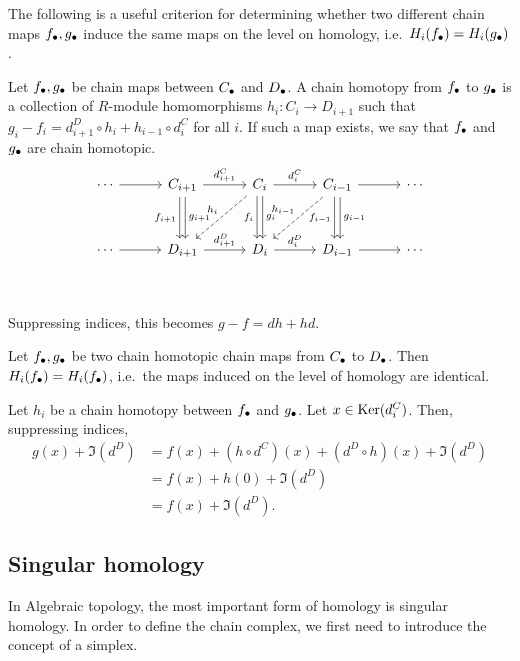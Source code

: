 The following is a useful criterion for determining whether two different chain maps $f_\bullet, g_\bullet$ induce the same maps on the level on homology, i.e.\ $H_i(f_\bullet) = H_i(g_\bullet)$.
\begin{definition}
    Let $f_\bullet, g_\bullet$ be chain maps between  $C_\bullet$ and $D_\bullet$.
    A chain homotopy from  $f_\bullet$ to  $g_\bullet$ is a collection of  $R$-module homomorphisms $h_i: C_i \to  D_{i+1}$ such that $g_i - f_i = d^{D}_{i+1}  \circ  h_i + h_{i-1}  \circ  d_i^{C}$ for all $i$.
    If such a map exists, we say that $f_\bullet$ and  $g_\bullet$ are chain homotopic.
    \[
        \begin{tikzcd}[column sep=3em, row sep=3em]
            \cdots  \arrow[r, ""]&
            C_{i+1} \arrow[r, "d_{i+1}^{C}"] \arrow[d, "f_{i+1}"', shift right=2pt] \arrow[d, "g_{i+1}", shift left=2pt]&
            C_{i} \arrow[r, "d_{i}^{C}"] \arrow[d, "f_i"', shift right=2pt] \arrow[d, "g_{i}", shift left=2pt] \arrow[dl, "h_i"', dashed]&
            C_{i-1} \arrow[r, ""] \arrow[d, "f_{i-1}"', shift right=2pt]\arrow[d, "g_{i-1}", shift left=2pt] \arrow[dl, "h_{i-1}"', dashed]&
            \cdots \\
            \cdots  \arrow[r, ""]&
            D_{i+1} \arrow[r, "d_{i+1}^{D}"] &
            D_{i} \arrow[r, "d_{i}^{D}"] &
            D_{i-1} \arrow[r, ""] &
            \cdots \\
        \end{tikzcd}
    \]
    Suppressing indices, this becomes $g - f = dh + hd$.
\end{definition}
\begin{prop}
    Let $f_\bullet, g_\bullet$ be two chain homotopic chain maps from $C_\bullet$ to $D_\bullet$. 
    Then $H_i(f_\bullet) = H_i(f_\bullet)$, i.e.\ the maps induced on the level of homology are identical.
\end{prop}
\begin{myproof}
    Let $h_i$ be a chain homotopy between  $f_\bullet$ and  $g_\bullet$.
    Let $x \in \operatorname{Ker}(d_i^{C})$.
    Then, suppressing indices,
    \begin{align*}
        g(x) + \Im(d^{D}) &= f(x) + (h  \circ  d^{C})(x) + (d^{D}  \circ h)(x)  + \Im(d^{D})\\
                          &= f(x) + h(0) + \Im(d^{D})\\
                        &= f(x) + \Im(d^{D}).
    \end{align*} 
\end{myproof}

\subsection*{Singular homology}
In Algebraic topology, the most important form of homology is singular homology.
In order to define the chain complex, we first need to introduce the concept of a simplex.

